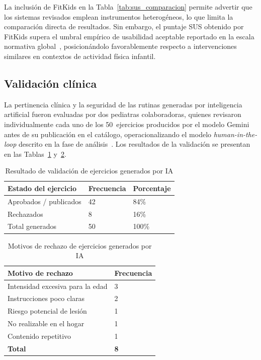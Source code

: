 				La inclusión de FitKids en la Tabla~\ref{tab:sus_comparacion} permite advertir que los sistemas revisados emplean instrumentos heterogéneos, lo que limita la comparación directa de resultados. Sin embargo, el puntaje SUS obtenido por FitKids supera el umbral empírico de usabilidad aceptable reportado en la escala normativa global~\cite{Bangor2008}, posicionándolo favorablemente respecto a intervenciones similares en contextos de actividad física infantil.
				
			\subsection{Validación clínica}
			\label{sec:valclinic}
				La pertinencia clínica y la seguridad de las rutinas generadas por inteligencia artificial fueron evaluadas por dos pediatras colaboradoras, quienes revisaron individualmente cada uno de los 50~ejercicios producidos por el modelo Gemini antes de su publicación en el catálogo, operacionalizando el modelo \textit{human-in-the-loop} descrito en la fase de análisis~\cite{Yim2024,GuerreroUlloa2024}. Los resultados de la validación se presentan en las Tablas~\ref{tab:validacion_ia} y~\ref{tab:motivos_rechazo}.
				
				\begin{table}[H]
					\centering\small
					\caption{Resultado de validación de ejercicios generados por IA}
					\label{tab:validacion_ia}
					\begin{tabular}{p{4.5cm}p{4.5cm}p{4.5cm}}
						\hline
						\textbf{Estado del ejercicio} & \textbf{Frecuencia} & \textbf{Porcentaje}\\
						\hline
						Aprobados / publicados & 42 & 84\%\\
						Rechazados & 8 & 16\%\\
						Total generados & 50 & 100\%\\
						\hline
					\end{tabular}
				\end{table}
				\tblnote
				
				\begin{table}[H]
					\centering\small
					\caption{Motivos de rechazo de ejercicios generados por IA}
					\label{tab:motivos_rechazo}
					\begin{tabular}{p{9.5cm}p{4.5cm}}
						\hline
						\textbf{Motivo de rechazo} & \textbf{Frecuencia}\\
						\hline
						Intensidad excesiva para la edad & 3\\
						Instrucciones poco claras & 2\\
						Riesgo potencial de lesión & 1\\
						No realizable en el hogar & 1\\
						Contenido repetitivo & 1\\
						\textbf{Total} & \textbf{8}\\
						\hline
					\end{tabular}
				\end{table}
				\tblnote
				
